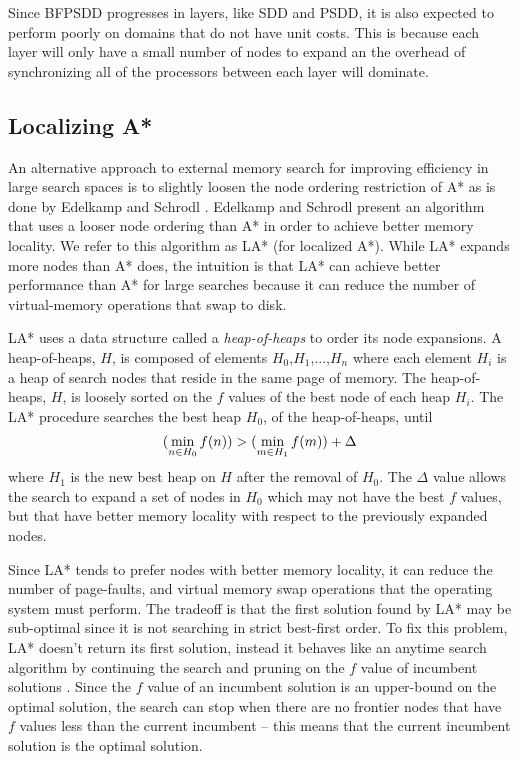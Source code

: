 \documentclass{article}
\begin{document}
 Since BFPSDD progresses in layers, like SDD and PSDD, it is also
 expected to perform poorly on domains that do not have unit costs.
 This is because each layer will only have a small number of nodes to
 expand an the overhead of synchronizing all of the processors between
 each layer will dominate.

 \subsection{Localizing A*}

 An alternative approach to external memory search for improving
 efficiency in large search spaces is to slightly loosen the node
 ordering restriction of A* as is done by Edelkamp and Schrodl
 \cite{edelkamp:loc}.  Edelkamp and Schrodl present an algorithm that
 uses a looser node ordering than A* in order to achieve better memory
 locality. We refer to this algorithm as LA* (for localized A*).  While
 LA* expands more nodes than A* does, the intuition is that LA* can
 achieve better performance than A* for large searches because it can
 reduce the number of virtual-memory operations that swap to disk.

 LA* uses a data structure called a \emph{heap-of-heaps} to order its
 node expansions.  A heap-of-heaps, $H$, is composed of elements
 $H_0$,$H_1$,...,$H_n$ where each element $H_i$ is a heap of search
 nodes that reside in the same page of memory.  The heap-of-heaps, $H$,
 is loosely sorted on the $f$ values of the best node of each heap $H_i$.
 The LA* procedure searches the best heap $H_0$, of the heap-of-heaps,
 until
 \begin{eqnarray*}
 (\mathop{\rm min}_{n \in H_0} f(n)) > (\mathop{\rm min}_{m \in H_1} f(m)) + \Delta
 \end{eqnarray*}
 where $H_1$ is the new best heap on $H$ after the removal of $H_0$.
 The $\Delta$ value allows the search to expand a set of nodes in $H_0$
 which may not have the best $f$ values, but that have better memory
 locality with respect to the previously expanded nodes.

 Since LA* tends to prefer nodes with better memory locality, it can
 reduce the number of page-faults, and virtual memory swap operations
 that the operating system must perform.  The tradeoff is that the
 first solution found by LA* may be sub-optimal since it is not
 searching in strict best-first order.  To fix this problem, LA*
 doesn't return its first solution, instead it behaves like an anytime
 search algorithm by continuing the search and pruning on the $f$ value
 of incumbent solutions \cite{hansen:ahs}.  Since the $f$ value of an
 incumbent solution is an upper-bound on the optimal solution, the
 search can stop when there are no frontier nodes that have $f$ values
 less than the current incumbent -- this means that the current
 incumbent solution is the optimal solution.
\end{document}
